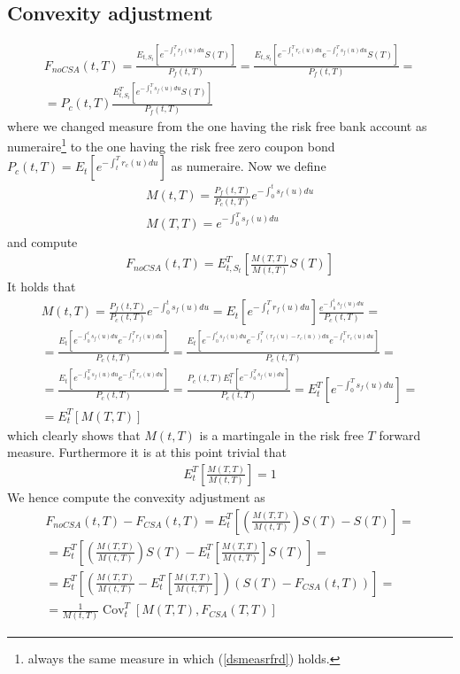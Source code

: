 \documentclass[a4paper,10pt]{report}
\theoremstyle{plain}
\theoremstyle{definition}
\DeclareMathOperator{\Cov}{Cov}
\newcommand\be{\begin{eqnarray}}    %
\newcommand\ee{\end{eqnarray}}
\begin{document}
\subsection{Convexity adjustment}
\be 
F_{noCSA}(t,T) =\frac{E_{t,S_t}\left[ e^{-\int_t^T r_f(u)du} S(T)\right]}{P_f(t,T)}=\frac{E_{t,S_t}\left[ e^{-\int_t^T r_c(u)du} e^{-\int_t^T s_f(u)du} S(T)\right]}{P_f(t,T)}=\\
=P_c(t,T)\frac{E_{t,S_t}^T\left[ e^{-\int_t^T s_f(u)du} S(T)\right]}{P_f(t,T)}
\ee
where we changed measure from the one having the risk free bank account as numeraire\footnote{always the same measure in which (\ref{dsmeasrfrd}) holds.} to the one having the risk free  zero coupon bond $P_c(t,T)=E_{t}\left[ e^{-\int_t^T r_c(u)du}\right]$ as numeraire.
Now we define
\be 
\label{mt}
M(t,T)=\frac{P_f(t,T)}{P_c(t,T)}e^{-\int_0^t s_f(u)du}\\
M(T,T)=e^{-\int_0^T s_f(u)du}
\ee
and compute
\be
\label{fnocsa} 
F_{noCSA}(t,T) = E_{t,S_t}^T\left[\frac{M(T,T)}{M(t,T)} S(T)\right]
\ee
It holds that 
\be 
M(t,T)=\frac{P_f(t,T)}{P_c(t,T)}e^{-\int_0^t s_f(u)du}=E_{t}\left[ e^{-\int_t^T r_f(u)du}\right]\frac{e^{-\int_0^t s_f(u)du}}{P_c(t,T)}=\\
= \frac{E_{t}\left[ e^{-\int_0^t s_f(u)du}e^{-\int_t^T r_f(u)du}\right]}{P_c(t,T)}=\frac{E_{t}\left[ e^{-\int_0^t s_f(u)du}e^{-\int_t^T (r_f(u)-r_c(u))du}e^{-\int_t^T r_c(u)du}\right]}{P_c(t,T)}=\\
=\frac{E_{t}\left[ e^{-\int_0^T s_f(u)du}e^{-\int_t^T r_c(u)du}\right]}{P_c(t,T)}=\frac{P_c(t,T) E_{t}^T\left[ e^{-\int_0^T s_f(u)du}\right]}{P_c(t,T)}=E_{t}^T\left[ e^{-\int_0^T s_f(u)du}\right]=\\
=E_{t}^T\left[ M(T,T)\right]
\ee
which clearly shows that $M(t,T)$ is a martingale in the risk free $T$ forward measure.
Furthermore it is at this point trivial that
\be 
E_{t}^T\left[ \frac{M(T,T)}{M(t,T)}\right]=1
\ee
We hence compute the convexity adjustment as
\be 
F_{noCSA}(t,T)-F_{CSA}(t,T)=E_{t}^T\left[\left( \frac{M(T,T)}{M(t,T)}\right) S(T) -  S(T)\right]=\\
=E_{t}^T\left[\left( \frac{M(T,T)}{M(t,T)}\right) S(T) -  E_{t}^T\left[ \frac{M(T,T)}{M(t,T)}\right] S(T)\right]=\\
=E_{t}^T\left[\left( \frac{M(T,T)}{M(t,T)}-E_{t}^T\left[ \frac{M(T,T)}{M(t,T)}\right]\right) \left(S(T) -F_{CSA}(t,T)\right)\right]=\\
\label{ca}
=\frac{1}{M(t,T)}\Cov_t^T\left[M(T,T),F_{CSA}(T,T)\right]
\ee
\end{document}
